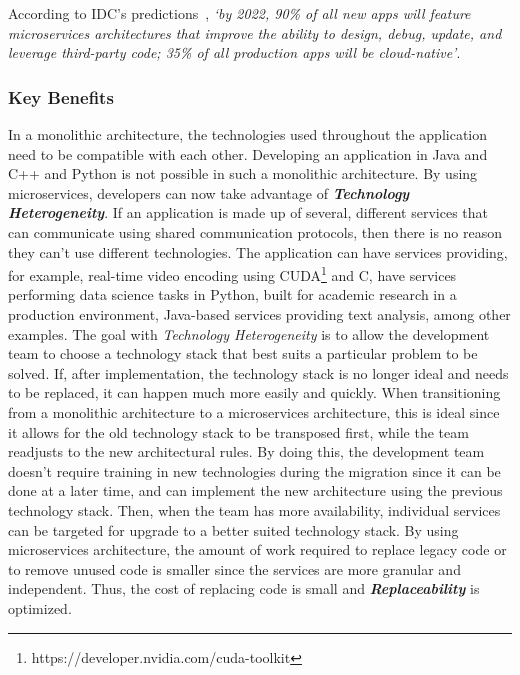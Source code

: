 According to IDC's predictions~\Parencite{idc_2019}, \textit{`by 2022, 90\% of all new apps will feature microservices architectures that improve the ability to design, debug, update, and leverage third-party code; 35\% of all production apps will be cloud-native'}.



\subsubsection{Key Benefits}\label{state-of-the-art:sss:key-benefits}

In a monolithic architecture, the technologies used throughout the application need to be compatible with each other. Developing an application in Java and C++ and Python is not possible in such a monolithic architecture. 
By using microservices, developers can now take advantage of \textbf{\textit{Technology Heterogeneity}}. If an application is made up of several, different services that can communicate using shared communication protocols, then there is no reason they can't use different technologies. The application can have services providing, for example, real-time video encoding using CUDA\footnote{\label{foot:cuda}https://developer.nvidia.com/cuda-toolkit} and C, have services performing data science tasks in Python, built for academic research in a production environment, Java-based services providing text analysis, among other examples. The goal with \textit{Technology Heterogeneity} is to allow the development team to choose a technology stack that best suits a particular problem to be solved. If, after implementation, the technology stack is no longer ideal and needs to be replaced, it can happen much more easily and quickly. When transitioning from a monolithic architecture to a microservices architecture, this is ideal since it allows for the old technology stack to be transposed first, while the team readjusts to the new architectural rules. By doing this, the development team doesn't require training in new technologies during the migration since it can be done at a later time, and can implement the new architecture using the previous technology stack. Then, when the team has more availability, individual services can be targeted for upgrade to a better suited technology stack. By using microservices architecture, the amount of work required to replace legacy code or to remove unused code is smaller since the services are more granular and independent. Thus, the cost of replacing code is small and \textbf{\textit{Replaceability}} is optimized.

